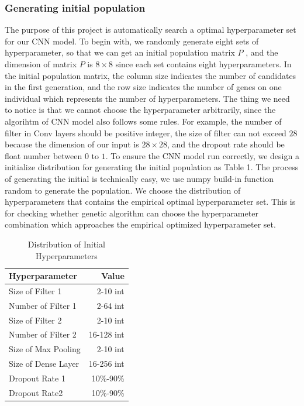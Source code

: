 \documentclass[12pt]{article}
\begin{document}
\subsubsection{Generating initial population}
The purpose of this project is automatically search a optimal hyperparameter set for our CNN model. To begin with, we randomly generate eight sets of hyperparameter, so that we can get an initial  population matrix $P$ , and the dimension of matrix $P$ is $8 \times 8$ since each set contains eight hyperparameters. In the initial population matrix, the column size indicates the number of candidates in the first generation, and the row size indicates the number of genes on one individual which represents the number of hyperparameters. The thing we need to notice is that we cannot choose the hyperparameter arbitrarily, since the algorihtm of CNN model also follows some rules. For example, the number of filter in Conv layers should be positive integer, the size of filter can not exceed $28$ because the dimension of our input is $28 \times 28$, and the dropout rate should be float number between $0$ to $1$. To ensure the CNN model run correctly, we design a initialize distribution for generating the initial population as Table 1. The process of generating the initial is technically easy, we use numpy build-in function random to generate the population. We choose the distribution of hyperparameters that contains the empirical optimal hyperparameter set. This is for checking whether genetic algorithm can choose the hyperparameter combination which approaches the empirical optimized hyperparameter set.
\begin{table}
\caption{Distribution of Initial Hyperparameters}
\centering
\begin{tabular}{l r}
\hline\hline 
Hyperparameter & Value \\ [0.5ex]
\hline
Size of Filter 1 & 2-10 int \\
Number of Filter 1 & 2-64 int \\
Size of Filter 2 & 2-10 int \\
Number of Filter 2 & 16-128 int \\
Size of Max Pooling & 2-10 int \\
Size of Dense Layer & 16-256 int \\
Dropout Rate 1 & 10\%-90\% \\
Dropout Rate2 & 10\%-90\% \\
\hline
\end{tabular}
\label{table:hpara}
\end{table}
\end{document}
